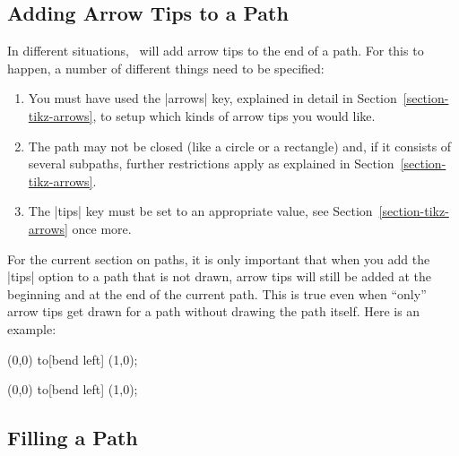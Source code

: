 \subsection{Adding Arrow Tips to a Path}
\label{section-arrow-tip-action}

In different situations, \tikzname\ will add arrow tips to the end of a path.
For this to happen, a number of different things need to be specified:
%
\begin{enumerate}
    \item You must have used the |arrows| key, explained in detail in
        Section~\ref{section-tikz-arrows}, to setup which kinds of arrow tips
        you would like.
    \item The path may not be closed (like a circle or a rectangle) and, if
        it consists of several subpaths, further restrictions apply as
        explained in Section~\ref{section-tikz-arrows}.
    \item The |tips| key must be set to an appropriate value, see
        Section~\ref{section-tikz-arrows} once more.
\end{enumerate}

For the current section on paths, it is only important that when you add the
|tips| option to a path that is not drawn, arrow tips will still be added at
the beginning and at the end of the current path. This is true even when
``only'' arrow tips get drawn for a path without drawing the path itself. Here
is an example:
%
\begin{codeexample}[width=2cm,preamble={\usetikzlibrary{arrows.meta,bending}}]
\tikz {} (0,0) to[bend left] (1,0);
\end{codeexample}
%
\begin{codeexample}[width=2cm,preamble={\usetikzlibrary{arrows.meta,bending}}]
\tikz {} (0,0) to[bend left] (1,0);
\end{codeexample}


\subsection{Filling a Path}
\label{section-rules}

